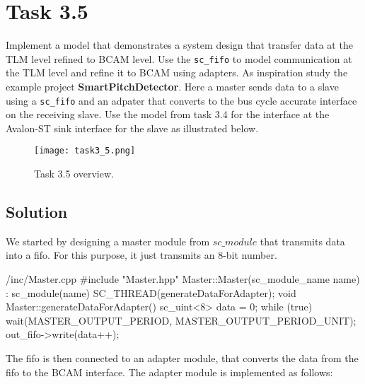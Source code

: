 \documentclass[../main.tex]{subfiles}
\begin{document}
\section{Task 3.5}

Implement a model that demonstrates a system design that transfer data at the TLM level refined to BCAM level. Use the \texttt{sc\_fifo} to model communication at the TLM level and refine it to BCAM using adapters. As inspiration study the example project \textbf{SmartPitchDetector}. Here a master sends data to a slave using a \texttt{sc\_fifo} and an adpater that converts to the bus cycle accurate interface on the receiving slave. Use the model from task 3.4 for the interface at the Avalon-ST sink interface for the slave as illustrated below.

\begin{figure}[h]
    \centering
    \texttt{[image: task3\_5.png]}
    \caption{Task 3.5 overview.}
\end{figure}

\subsection*{Solution}

We started by designing a master module from $sc\_module$ that transmits data into a fifo. For this purpose, it just transmits an 8-bit number.

\begin{myminted}{/inc/Master.cpp}
#include "Master.hpp"
Master::Master(sc_module_name name) : sc_module(name)
{
	SC_THREAD(generateDataForAdapter);
}
void Master::generateDataForAdapter() {
	sc_uint<8> data = 0;
	while (true){
		wait(MASTER_OUTPUT_PERIOD, MASTER_OUTPUT_PERIOD_UNIT);
		out_fifo->write(data++);	
	}
}
\end{myminted}

The fifo is then connected to an adapter module, that converts the data from the fifo to the BCAM interface. The adapter module is implemented as follows:
\end{document}
